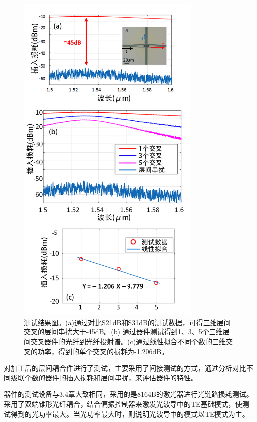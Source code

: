 \begin{figure}[!htbp]
    \centering
    \includegraphics[width=0.8\textwidth]{Img/4-15.png}
    \caption{测试结果图。(a)通过对比S21dB和S31dB的测试数据，可得三维层间交叉的层间串扰大于-45dB。(b) 通过器件测试得到1、3、5个三维层间交叉器件的光纤到光纤投射谱。(c)通过线性拟合不同个数的三维交叉的功率，得到的单个交叉的损耗为-1.206dB。}
    \label{fig:4-15}
\end{figure}

对加工后的层间耦合件进行了测试，主要采用了间接测试的方式，通过分析对比不同级联个数的器件的插入损耗和层间串扰，来评估器件的特性。

 
器件的测试设备与3.4章大致相同，采用的是8164B的激光器进行光链路损耗测试。采用了双端锥形光纤耦合，结合偏振控制器来激发光波导中的TE基础模式，使测试得到的光功率最大。当光功率最大时，则说明光波导中的模式以TE模式为主。

